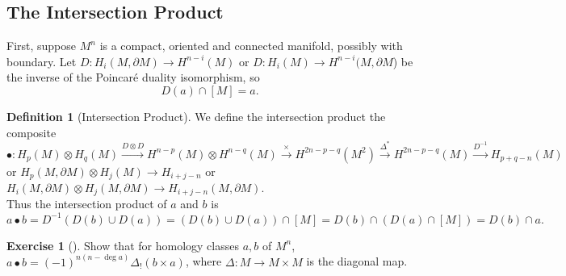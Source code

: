 \documentclass[reqno]{amsart}
\theoremstyle{definition}
\newtheorem{definition}[theorem]{Definition}
\newtheorem{exercise}[theorem]{Exercise}
\theoremstyle{remark}
\begin{document}
      \subsection{The Intersection Product}

      First, suppose $M^{n}$ is a compact, oriented and connected manifold,
      possibly with boundary. 
      Let $D \colon H_i (M, \partial M) \to 
      H^{n-i}(M)$ or $D \colon H_i (M) \to H^{n-i}(M, \partial M$)
      be the inverse of the Poincaré duality isomorphism, so
      \[
      D(a) \cap \left[ M \right]  = a.
      \] 
      
      \begin{definition}[Intersection Product]
          We define the intersection product the composite
          \[
          \bullet \colon
          H_p (M) \otimes H_q(M) 
          \stackrel{D \otimes D}{\to} 
          H^{n-p}(M) \otimes H^{n-q}(M) 
          \stackrel{\times }{\to} H^{2n-p-q}(M^2)
          \stackrel{\Delta^{*}}{\to} H^{2n-p-q}(M)
          \stackrel{D^{-1}}{\to} H_{p+q-n}(M)
          \] 
          or
          $H_p(M, \partial M) \otimes H_j(M) \to 
          H_{i+j-n}$ or
          $H_{i}(M, \partial M) \otimes H_j(M , \partial M) \to
          H_{i+j-n}(M, \partial M)$.\\

          Thus the intersection product of $a$ and $b$ is
          \[
          a \bullet b = 
          D^{-1} \left( D(b) \cup D(a) \right) 
          = \left( D (b) \cup  D(a) \right) \cap \left[ M \right] 
          = D(b) \cap \left( D(a) \cap \left[ M \right]  \right) 
          = D(b) \cap a.
          \] 
      \end{definition}

      \begin{exercise}[]
          Show that for homology classes
          $a,b$ of $M^{n}$, 
          $a \bullet b = 
          (-1)^{n\left( n - \deg a \right) }\Delta_{!} (b \times a)$,
          where $\Delta \colon M \to M \times M$ is the
          diagonal map.
      \end{exercise}
\end{document}

